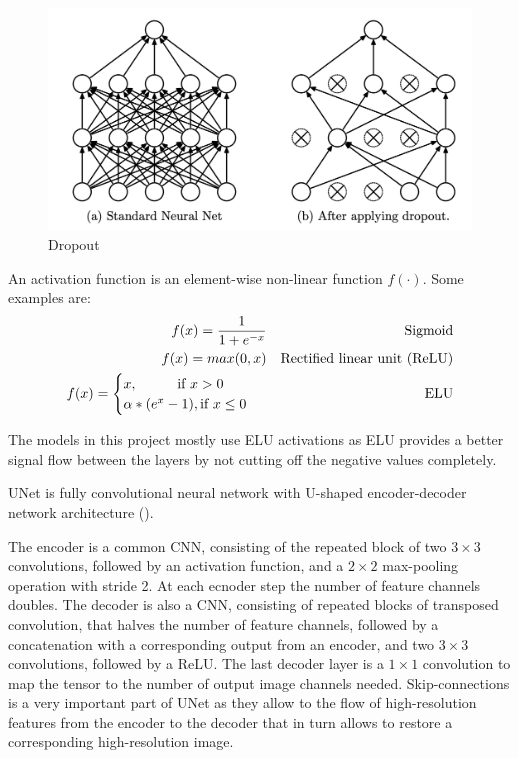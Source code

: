\begin{figure}[H]
	\begin{center}
		\includegraphics[width=0.5\linewidth]{bilder/dropout.png}
		\caption{Dropout}
		\label{fig:dropout}
	\end{center}
\end{figure}

\begin{definition}
	An activation function is an element-wise non-linear function $f(\cdot)$. Some examples are:
	\begin{align}             
		f(x) = \frac{1}{1 + e^{-x}} &&\text{Sigmoid} \\      
		f(x) = max(0, x) &&\text{Rectified linear unit (ReLU)}\\
		f(x) = \begin{cases}
				x, \hspace*{1cm} \textrm{if } x > 0 \\
				\alpha * (e^{x} - 1), \textrm{if }  x \leq 0
		  	\end{cases}\ &&\text{ELU}
		\end{align}
\end{definition}

The models in this project mostly use ELU activations as ELU provides a better signal flow between the layers by not cutting off the negative values completely.

\begin{definition}[UNet]
	UNet is fully convolutional neural network with U-shaped encoder-decoder network architecture (\cite{Ronneberger_2015}).
\end{definition}

The encoder is a common CNN, consisting of the repeated
block of two $3 \times 3$ convolutions, followed by
an activation function, and a $2 \times 2$ max-pooling operation with stride 2. At each ecnoder step  the number of feature channels doubles. The decoder is also a CNN, consisting of repeated blocks of transposed convolution, that halves the number of feature channels, followed by a concatenation with a corresponding output from an encoder, and two $3 \times 3$ convolutions, followed by a ReLU. The last decoder layer is a $1 \times 1$ convolution to map the tensor to the number of output image channels needed. Skip-connections is a very important part of UNet as they allow to the flow of high-resolution features from the encoder to the decoder that in turn allows to restore a corresponding high-resolution image.

